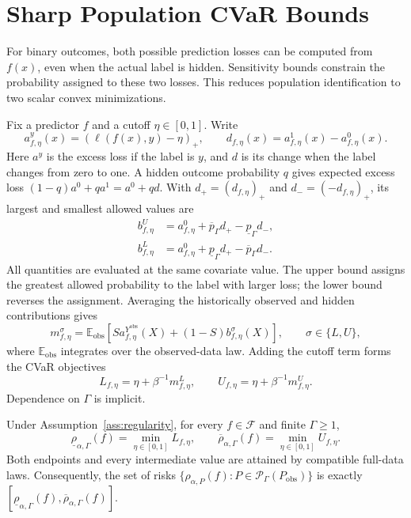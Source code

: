 \section{Sharp Population CVaR Bounds}
\label{sec:population}
\label{sec:sharp-intervals}
For binary outcomes, both possible prediction losses can be computed from \(f(x)\), even when the actual label is hidden. Sensitivity bounds constrain the probability assigned to these two losses. This reduces population identification to two scalar convex minimizations.

Fix a predictor \(f\) and a cutoff \(\eta\in[0,1]\). Write
\[
 a^y_{f,\eta}(x)=(\ell(f(x),y)-\eta)_+,
 \qquad
 d_{f,\eta}(x)=a^1_{f,\eta}(x)-a^0_{f,\eta}(x).
\]
Here \(a^y\) is the excess loss if the label is \(y\), and \(d\) is its change when the label changes from zero to one. A hidden outcome probability \(q\) gives expected excess loss \((1-q)a^0+qa^1=a^0+qd\). With \(d_+=(d_{f,\eta})_+\) and \(d_-=(-d_{f,\eta})_+\), its largest and smallest allowed values are
\begin{equation}
\begin{aligned}
 b^U_{f,\eta}&=a^0_{f,\eta}+\overline p_\Gamma d_+-\underline p_\Gamma d_-,\\
 b^L_{f,\eta}&=a^0_{f,\eta}+\underline p_\Gamma d_+-\overline p_\Gamma d_-.
\end{aligned}
\label{eq:endpoint-values}
\end{equation}
All quantities are evaluated at the same covariate value. The upper bound assigns the greatest allowed probability to the label with larger loss; the lower bound reverses the assignment. Averaging the historically observed and hidden contributions gives
\[
 m^\sigma_{f,\eta}
 =\mathbb E_{\mathrm{obs}}\!\left[
 S a^{Y^{\mathrm{obs}}}_{f,\eta}(X)+(1-S)b^\sigma_{f,\eta}(X)
 \right],
 \qquad \sigma\in\{L,U\},
\]
where \(\mathbb E_{\mathrm{obs}}\) integrates over the observed-data law. Adding the cutoff term forms the CVaR objectives
\[
 L_{f,\eta}=\eta+\beta^{-1}m^L_{f,\eta},
 \qquad U_{f,\eta}=\eta+\beta^{-1}m^U_{f,\eta}.
\]
Dependence on \(\Gamma\) is implicit.

\begin{theorem}
\label{thm:cvar-sharp}
Under Assumption~\ref{ass:regularity}, for every \(f\in\mathcal F\) and finite \(\Gamma\ge1\),
\[
 \underline\rho_{\alpha,\Gamma}(f)=\min_{\eta\in[0,1]}L_{f,\eta},
 \qquad
 \overline\rho_{\alpha,\Gamma}(f)=\min_{\eta\in[0,1]}U_{f,\eta}.
\]
Both endpoints and every intermediate value are attained by compatible full-data laws. Consequently, the set of risks \(\{\rho_{\alpha,P}(f):P\in\mathcal P_\Gamma(P_{\mathrm{obs}})\}\) is exactly \([\underline\rho_{\alpha,\Gamma}(f),\overline\rho_{\alpha,\Gamma}(f)]\).
\end{theorem}

